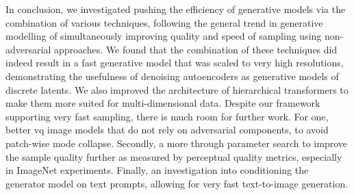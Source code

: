 
In conclusion, we investigated pushing the efficiency of generative models via
the combination of various techniques, following the general trend in generative
modelling of simultaneously improving quality and speed of sampling using
non-adversarial approaches. We found that the combination of these techniques
did indeed result in a fast generative model that was scaled to very high
resolutions, demonstrating the usefulness of denoising autoencoders as
generative models of discrete latents. We also improved the architecture of
hierarchical transformers to make them more suited for multi-dimensional data.
Despite our framework supporting very fast sampling, there is much room for
further work. For one, better \gls{vq} image models that do not rely on
adversarial components, to avoid patch-wise mode collapse. Secondly, a more
through parameter search to improve the sample quality further as measured by
perceptual quality metrics, especially in ImageNet experiments. Finally, an
investigation into conditioning the generator model on text prompts, allowing
for very fast text-to-image generation.
